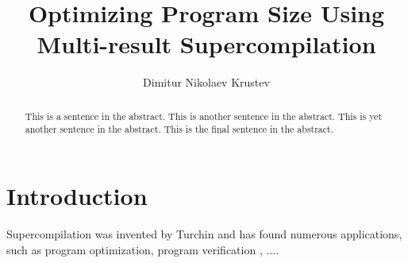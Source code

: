 \documentclass[submission,copyright,creativecommons]{eptcs}
\title{Optimizing Program Size Using Multi-result Supercompilation}
\author{Dimitur Nikolaev Krustev
\institute{IGE+XAO Balkan\\ Sofia, Bulgaria}
\email{\quad dkrustev@ige-xao.com}
}
\begin{document}
\maketitle

\begin{abstract}
This is a sentence in the abstract.
This is another sentence in the abstract.
This is yet another sentence in the abstract.
This is the final sentence in the abstract.
\end{abstract}

\section{Introduction}

Supercompilation was invented by Turchin \cite{TurchinSupercompilerConcept} and has found numerous
applications, such as program optimization\cite{Sorensen1994TurchinSupercompiler,sorm98b,TMR/SCP2014}, 
program verification \cite{Klyuchnikov2010,MendelGleasonPhD2011},
$\ldots$.
\end{document}

